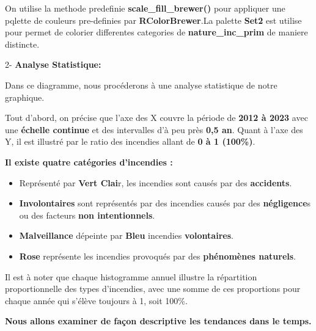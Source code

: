 \documentclass[
]{article}
\begin{document}
On utilise la methode predefinie \textbf{scale\_fill\_brewer()} pour
appliquer une pqlette de couleurs pre-definies par
\textbf{RColorBrewer}.La palette \textbf{Set2} est utilise pour permet
de colorier differentes categories de \textbf{nature\_inc\_prim} de
maniere distincte.

2- \textbf{Analyse Statistique:}

Dans ce diagramme, nous procéderons à une analyse statistique de notre
graphique.

Tout d'abord, on précise que l'axe des X couvre la période de
\textbf{2012 à 2023} avec une \textbf{échelle continue} et des
intervalles d'à peu près \textbf{0,5 an}. Quant à l'axe des Y, il est
illustré par le ratio des incendies allant de \textbf{0 à 1 (100\%)}.

\textbf{Il existe quatre catégories d'incendies :}

\begin{itemize}
\item
  Représenté par \textbf{Vert Clai}r, les incendies sont causés par des
  \textbf{accidents}.
\item
  \textbf{Involontaires} sont représentés par des incendies causés par
  des \textbf{négligence}s ou des facteurs \textbf{non intentionnels}.
\item
  \textbf{Malveillance} dépeinte par \textbf{Bleu} incendies
  \textbf{volontaires}.
\item
  \textbf{Rose} représente les incendies provoqués par des
  \textbf{phénomènes naturels}.
\end{itemize}

Il est à noter que chaque histogramme annuel illustre la répartition
proportionnelle des types d'incendies, avec une somme de ces proportions
pour chaque année qui s'élève toujours à 1, soit 100\%.

\textbf{Nous allons examiner de façon descriptive les tendances dans le
temps.}
\end{document}
